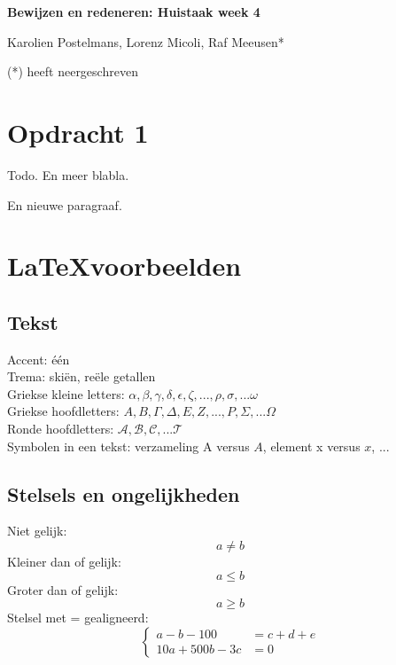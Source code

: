 \documentclass[a4paper]{article}
\begin{document}
\begin{center}
{\Large\bf Bewijzen en redeneren: Huistaak week 4} \par\vspace{.5em}
{Karolien Postelmans, Lorenz Micoli, Raf Meeusen*}
\end{center}


(*) heeft neergeschreven

\section*{Opdracht 1}
Todo. 
En meer blabla. 

En nieuwe paragraaf. 

\section*{\LaTeX voorbeelden}
\subsection*{Tekst}
Accent: \'{e}\'{e}n\\
Trema: ski\"en, re\"ele getallen  \\
Griekse kleine letters: $\alpha, \beta, \gamma, \delta, \epsilon, \zeta, ..., \rho, \sigma, ... \omega$ \\
Griekse hoofdletters: $A, B, \Gamma, \Delta, E, Z, ... , P, \Sigma, ... \Omega$ \\
Ronde hoofdletters: $\mathcal{A, B, C, ... T}$ \\ 
Symbolen in een tekst: verzameling A versus $A$, element x versus $x$, ... \\

\subsection*{Stelsels en ongelijkheden}
Niet gelijk: \[a \neq b\]
Kleiner dan of gelijk: \[a \leq b\]
Groter dan of gelijk: \[a \geq b\] 
Stelsel met = gealigneerd: 
\[\left\{ 
\begin{aligned}
a-b-100 &= c + d + e\\
10a + 500b - 3c &= 0 
\end{aligned} 
\right.\]
\end{document}
